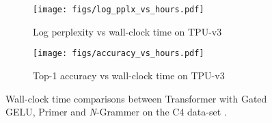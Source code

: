 \documentclass[11pt]{article}
\begin{document}
\begin{figure*}[htbp]
\centering
    \begin{subfigure}[l]{1.0\columnwidth}
        \texttt{[image: figs/log\_pplx\_vs\_hours.pdf]}
        \caption{Log perplexity vs wall-clock time on TPU-v3}\label{fig:wall-ppl}
    \end{subfigure}
    \hfill{}
    \begin{subfigure}[r]{1.0\columnwidth}
        \texttt{[image: figs/accuracy\_vs\_hours.pdf]}
        \caption{Top-1 accuracy vs wall-clock time on TPU-v3}\label{fig:wall-acc}
    \end{subfigure}
\caption{Wall-clock time comparisons between Transformer with 
Gated GELU, Primer and \textit{N}-Grammer on the C4 data-set \citep{raffel2019exploring}.}
\label{fig:wall}
\end{figure*}
\end{document}

